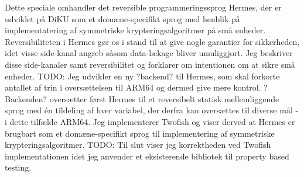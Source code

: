Dette speciale omhandler det reversible programmeringssprog Hermes, der er udviklet på DiKU som et domæne-specifikt sprog med henblik på implementatering af symmetriske krypteringsalgoritmer på små enheder.
Reversibiliteten i Hermes gør os i stand til at give nogle garantier for sikkerheden, idet visse side-kanal angreb såsom data-lækage bliver umuliggjort. Jeg beskriver disse side-kanaler samt reversibilitet og forklarer om intentionen om at sikre små enheder.
TODO: Jeg udvikler en ny ?backend? til Hermes, som skal forkorte antallet af trin i oversættelsen til ARM64 og dermed give mere kontrol.
?Backenden? oversætter først Hermes til et reversibelt statisk mellemliggende sprog med én tildeling af hver variabel, der derfra kan oversættes til diverse mål - i dette tilfælde ARM64. 
Jeg implementerer Twofish og viser derved at Hermes er brugbart som et domæne-specifikt sprog til implementering af symmetriske krypteringsalgoritmer.
TODO: Til slut viser jeg korrektheden ved Twofish implementationen idet jeg anvender et eksisterende bibliotek til property based testing. 
